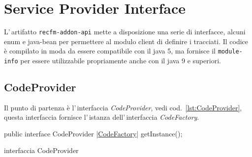 \documentclass[a4paper,10pt]{report}
\newif\ifesource
\newenvironment{elisting}[1][!htb]
  {\captionsetup{aboveskip=0pt}\begin{listing}[#1]}
  {\end{listing}%
}
\begin{document}
%


\tableofcontents
\listoffigures
\listoftables

\ifesource
\lstlistoflistings
\else
\listoflistings
\fi

\clearpage

%                                           

\chapter{Service Provider Interface}
L'\,artifatto \verb!recfm-addon-api! mette a disposizione una serie di 
interfacce, alcuni enum e java-bean per permettere al modulo client di definire
i tracciati. 
Il codice è compilato in moda da essere compatibile con il java 5, ma fornisce
il \verb!module-info! per essere utilizzabile propriamente anche con il java 9
e superiori.

\section{CodeProvider}
Il punto di partenza è l'\,interfaccia \textsl{CodeProvider}, vedi 
cod.~\ref{lst:CodeProvider}, questa interfaccia fornisce l'\,istanza 
dell'\,in\-ter\-fac\-cia \textsl{CodeFactory}.

\ifesource
\begin{figure*}[!htb]
\begin{lstlisting}[language=java, caption=interfaccia CodeProvider, 
label=lst:CodeProviderv]
public interface CodeProvider {
     (*\hyperref[lst:CodeFactory]{CodeFactory}*) getInstance();
}
\end{lstlisting}
\end{figure*}
\else
\begin{elisting}
\begin{javacode}
public interface CodeProvider {
     |\hyperref[lst:CodeFactory]{CodeFactory}| getInstance();
}
\end{javacode}
\caption{interfaccia CodeProvider}\label{lst:CodeProvider}
\end{elisting}
\fi
\end{document}
